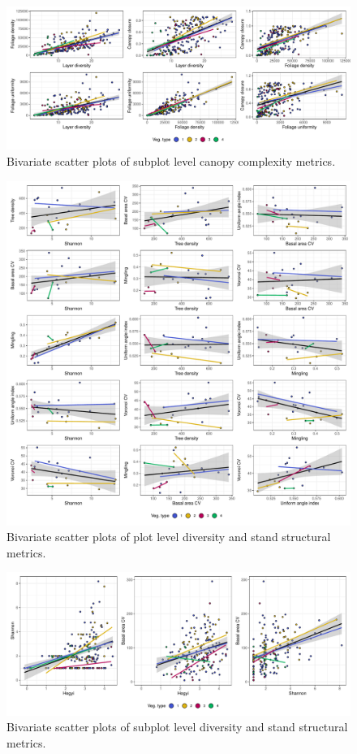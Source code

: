 \documentclass[11pt,a4paper]{article}
\begin{document}
\begin{figure}
	\includegraphics[width=\linewidth]{canopy_metric_comp_subplot}
	\caption{Bivariate scatter plots of subplot level canopy complexity metrics.}
	\label{canopy_metric_comp_subplot}
\end{figure}

\begin{figure}
	\includegraphics[width=\linewidth]{pred_comp_plot}
	\caption{Bivariate scatter plots of plot level diversity and stand structural metrics.}
	\label{pred_comp_plot}
\end{figure}

\begin{figure}
	\includegraphics[width=\linewidth]{pred_comp_subplot}
	\caption{Bivariate scatter plots of subplot level diversity and stand structural metrics.}
	\label{pred_comp_subplot}
\end{figure}


\end{document}
